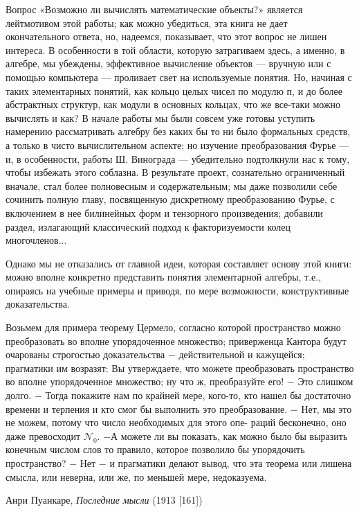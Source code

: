 {{   Вопрос «Возможно ли вычислять математические объекты?» является лейтмотивом этой работы; как можно убедиться, эта книга не дает окончательного ответа, но, надеемся, показывает, что этот вопрос не лишен интереса. В особенности в той области, которую затрагиваем здесь, а именно, в алгебре, мы убеждены, эффективное вычисление объектов — вручную или с помощью компьютера — проливает свет на используемые понятия. Но, начиная с таких элементарных понятий, как кольцо целых чисел по модулю п, и до более абстрактных структур, как модули в основных кольцах, что же все-таки можно вычислять и как? В начале работы мы были совсем уже готовы уступить намерению рассматривать алгебру без каких бы то ни было формальных средств, а только в чисто вычислительном аспекте; но изучение преобразования Фурье — и, в особенности, работы Ш. Винограда — убедительно подтолкнули нас к тому, чтобы избежать этого соблазна. В результате проект, сознательно ограниченный вначале, стал более полновесным и содержательным; мы даже позволили себе сочинить полную главу, посвященную дискретному преобразованию Фурье, с включением в нее билинейных форм и тензорного произведения; добавили раздел, излагающий классический подход к факторизуемости колец многочленов...

   Однако мы не отказались от главной идеи, которая составляет основу этой книги: можно вполне конкретно представить понятия элементарной алгебры, т.е., опираясь на учебные примеры и приводя, по мере возможности, конструктивные доказательства.\pagebreak

\restoretop
{}
\epigraph{Возьмем  для  примера  теорему  Цермело,  согласно  которой
пространство  можно  преобразовать  во  вполне  упорядоченное
множество; приверженца  Кантора будут очарованы строгостью
доказательства  $-$   действительной  и  кажущейся;  прагматики
им  возразят:  Вы утверждаете,  что можете  преобразовать  пространство  во  вполне упорядоченное  множество;  ну  что ж,  преобразуйте его!
$-$  Это слишком долго.  $-$   Тогда  покажите  нам
по крайней  мере,  кого-то,  кто нашел  бы достаточно  времени  и
терпения и кто смог бы выполнить это преобразование.  $-$  Нет,
мы это не можем, потому что число необходимых для этого опе-
раций бесконечно,  оно даже превосходит $\mathcal{N}_0.$ $-$А можете ли вы
показать,  как  можно  было бы  выразить  конечным  числом  слов
то правило,  которое позволило  бы упорядочить  пространство?
$-$  Нет  $-$   и  прагматики  делают  вывод,  что  эта  теорема  или
лишена  смысла,  или  неверна,  или же,  по  меньшей мере,  недока­зуема.}{
Анри Пуанкаре, \textit{Последние мысли} (1913 [161])}

}}
